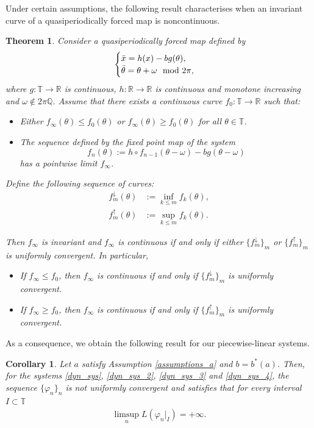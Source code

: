\documentclass[12pt]{article}
\newcommand{\T}{\mathbb{T}}
\newcommand{\R}{\mathbb{R}}
\newcommand{\Q}{\mathbb{Q}}
\theoremstyle{plain}
\newtheorem{thm}[defn]{Theorem}
\newtheorem{corollary}[defn]{Corollary}
\theoremstyle{remark}
\theoremstyle{definition}
\begin{document}
Under certain assumptions, the following result characterises when an invariant curve of a quasiperiodically forced map is noncontinuous.
\begin{thm}\label{mon_characterization}
    Consider a quasiperiodically forced map defined by
    \begin{align*}
        \begin{cases}
            \Bar{x} = h(x) - b g(\theta),\\
            \Bar{\theta} = \theta + \omega \mod2\pi,
        \end{cases}
    \end{align*}
    where $g\colon\T\to\R$ is continuous, $h\colon\R\to\R$ is continuous and monotone increasing and $\omega\not\in2\pi\Q$. 
    Assume that there exists a continuous curve $f_0\colon\T\to\R$ such that:
    \begin{itemize}
        \item Either $f_\infty(\theta) \leq f_0(\theta)$ or $f_\infty(\theta)\geq f_0(\theta)$ for all $\theta\in\T$.
        \item The sequence defined by the fixed point map of the system $$f_n(\theta):=h\circ f_{n-1}(\theta-\omega)- b g(\theta-\omega)$$ has a pointwise limit $f_\infty$.
    \end{itemize}
    Define the following sequence of curves:
    \begin{align*}
        f_m^{\downarrow}(\theta)&:=\inf_{k\leq m}f_k(\theta),\\
        f_m^{\uparrow}(\theta)&:=\sup_{k\leq m}f_k(\theta).
    \end{align*}
    
    Then $f_\infty$ is invariant and $f_\infty$ is continuous if and only if either $\{f_m^{\downarrow}\}_m$ or $\{f_m^{\uparrow}\}_m$ is uniformly convergent. In particular,
    \begin{itemize}
        \item If $f_\infty\leq f_0$, then $f_\infty$ is continuous if and only if $\{f_m^{\downarrow}\}_m$ is uniformly convergent.
        \item If $f_\infty\geq f_0$, then $f_\infty$ is continuous if and only if $\{f_m^{\uparrow}\}_m$ is uniformly convergent.
    \end{itemize}
\end{thm}

As a consequence, we obtain the following result for our piecewise-linear systems.
\begin{corollary}\label{char_corollary}
    Let $a$ satisfy Assumption \eqref{assumptions_a} and $b=b^*(a)$.   
    Then, for the systems \eqref{dyn_sys}, \eqref{dyn_sys_2}, \eqref{dyn_sys_3} and \eqref{dyn_sys_4}, the sequence $\{\varphi_n\}_n$ is not uniformly convergent and satisfies that for every interval $I\subset\T$
        \begin{align*}
            \limsup_n L(\varphi_n|_I)=+\infty.
        \end{align*}
\end{corollary}
\end{document}
